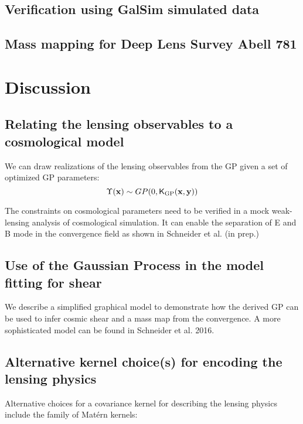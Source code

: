 \subsection{Verification using {\sc GalSim} simulated data}
\subsection{Mass mapping for Deep Lens Survey Abell 781}


\section{Discussion}

\subsection{Relating the lensing observables to a cosmological model}
We can draw realizations of the lensing observables from the GP given a set of
optimized GP parameters:
\begin{equation}
	\Upsilon(\mathbf{x}) \sim GP(0, \mathsf{K}_{\rm GP}(\mathbf{x}, \mathbf{y})) 
\end{equation}


The constraints on cosmological parameters need to be verified in a mock
weak-lensing analysis of cosmological simulation. 
It can enable the separation of E and B mode in the convergence field as shown
in Schneider et al. (in prep.) 

\subsection{Use of the Gaussian Process in the model fitting for shear}
We describe a simplified graphical model to demonstrate how the derived GP can
be used to infer cosmic shear and a mass map from the convergence.
A more sophisticated model can be found in Schneider et al. 2016.






\subsection{Alternative kernel choice(s) for encoding the lensing physics}
Alternative choices for a covariance kernel for describing the lensing physics 
include the family of Mat\'{e}rn kernels:
% 

